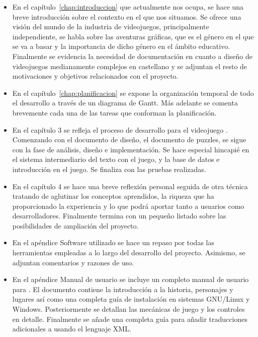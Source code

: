 \begin{itemize}

\item En el capítulo~\ref{chap:introduccion} que actualmente nos ocupa, se hace una breve introducción sobre el contexto en el que nos situamos. Se ofrece una visión del mundo de la industria de videojuegos, principalmente independiente, se habla sobre las aventuras gráficas, que es el género en el que se va a basar \nombrejuego y la importancia de dicho género en el ámbito educativo. Finalmente se evidencia la necesidad de documentación en cuanto a diseño de videojuegos medianamente complejos en castellano y se adjuntan el resto de motivaciones y objetivos relacionados con el proyecto.

\item En el capítulo~\ref{chap:planificacion} se expone la organización temporal de todo el desarrollo a través de un diagrama de Gantt. Más adelante se comenta brevemente cada una de las tareas que conforman la planificación.

\item En el capítulo 3 se refleja el proceso de desarrollo para el videojuego \nombrejuego. Comenzando con el documento de diseño, el documento de puzzles, se sigue con la fase de análisis, diseño e implementación. Se hace especial hincapié en el sistema intermediario del texto con el juego, y la base de datos e introducción en el juego. Se finaliza con las pruebas realizadas.

\item En el capítulo 4 se hace una breve reflexión personal seguida de otra técnica tratando de aglutinar los conceptos aprendidos, la riqueza que ha proporcionado la experiencia y lo que podrá aportar tanto a usuarios como desarrolladores. Finalmente termina con un pequeño listado sobre las posibilidades de ampliación del proyecto.

\item En el apéndice Software utilizado se hace un repaso por todas las herramientas empleadas a lo largo del desarrollo del proyecto. Asimismo, se adjuntan comentarios y razones de uso.

\item En el apéndice Manual de usuario se incluye un completo manual de usuario para \nombrejuego. El documento contiene la introducción a la historia, personajes y lugares así como una completa guía de instalación en sistemas GNU/Linux y Windows. Posteriormente se detallan las mecánicas de juego y los controles en detalle. Finalmente se añade una completa guía para añadir traducciones adicionales a \nombrejuego usando el lenguaje XML.

\end{itemize}

